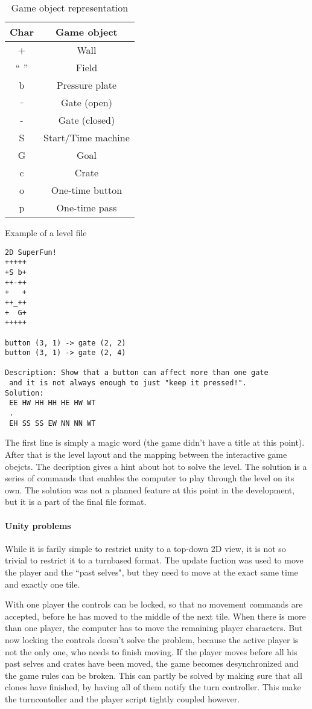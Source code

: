 \begin{table}
\caption{Game object representation}
\begin{tabular}{|c|c|}
\hline
Char & Game object\\
\hline
+ & Wall\\
`` '' & Field\\
b & Pressure plate\\
$\_$ & Gate (open)\\
- & Gate (closed)\\
S & Start/Time machine\\
G & Goal\\
c & Crate\\
o & One-time button\\
p & One-time pass\\
\hline
\end{tabular}
\end{table}

Example of a level file

\begin{verbatim}
2D SuperFun!
+++++
+S b+
++-++
+   +
++_++
+  G+
+++++

button (3, 1) -> gate (2, 2)
button (3, 1) -> gate (2, 4)

Description: Show that a button can affect more than one gate
 and it is not always enough to just "keep it pressed!".
Solution:
 EE HW HH HH HE HW WT
 .
 EH SS SS EW NN NN WT
\end{verbatim}

The first line is simply a magic word (the game didn't have a title at this point).
After that is the level layout and the mapping between the interactive game
obejcts. The decription gives a hint about hot to solve the level. The solution
is a series of commands that enables the computer to play through the level
on its own. The solution was not a planned feature at this point in the
development, but it is a part of the final file format.

\paragraph{Unity problems}
While it is farily simple to restrict unity to a top-down 2D view, it
is not so trivial to restrict it to a turnbased format. The update
fuction was used to move the player and the ``past selves", but they need
to move at the exact same time and exactly one tile.

With one player the controls can be locked, so that no movement commands
are accepted, before he has moved to the middle of the next tile. When
there is more than one player, the computer has to move the remaining player
characters. But now locking the controls doesn't solve the problem,
because the active player is not the only one, who needs to finish
moving. If the player moves before all his past selves and crates have
been moved, the game becomes desynchronized and the game rules can be
broken. This can partly be solved by making sure that all clones have
finished, by having all of them notify the turn controller. This make
the turncontoller and the player script tightly coupled however.

